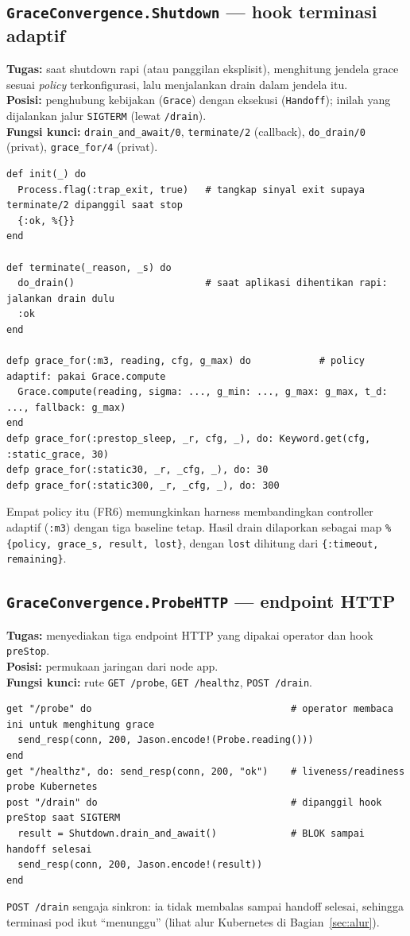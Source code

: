 \documentclass[11pt]{article}
\newcommand{\code}[1]{\texttt{\small #1}}
\begin{document}
\subsection{\texttt{GraceConvergence.Shutdown} --- hook terminasi adaptif}
\textbf{Tugas:} saat shutdown rapi (atau panggilan eksplisit), menghitung jendela grace sesuai
\emph{policy} terkonfigurasi, lalu menjalankan drain dalam jendela itu. \\
\textbf{Posisi:} penghubung kebijakan (\code{Grace}) dengan eksekusi (\code{Handoff}); inilah yang
dijalankan jalur \code{SIGTERM} (lewat \code{/drain}). \\
\textbf{Fungsi kunci:} \code{drain\_and\_await/0}, \code{terminate/2} (callback), \code{do\_drain/0}
(privat), \code{grace\_for/4} (privat).
\begin{lstlisting}[style=ex]
def init(_) do
  Process.flag(:trap_exit, true)   # tangkap sinyal exit supaya terminate/2 dipanggil saat stop
  {:ok, %{}}
end

def terminate(_reason, _s) do
  do_drain()                       # saat aplikasi dihentikan rapi: jalankan drain dulu
  :ok
end

defp grace_for(:m3, reading, cfg, g_max) do            # policy adaptif: pakai Grace.compute
  Grace.compute(reading, sigma: ..., g_min: ..., g_max: g_max, t_d: ..., fallback: g_max)
end
defp grace_for(:prestop_sleep, _r, cfg, _), do: Keyword.get(cfg, :static_grace, 30)
defp grace_for(:static30, _r, _cfg, _), do: 30
defp grace_for(:static300, _r, _cfg, _), do: 300
\end{lstlisting}
Empat policy itu (FR6) memungkinkan harness membandingkan controller adaptif (\code{:m3}) dengan tiga
baseline tetap. Hasil drain dilaporkan sebagai map \code{\%\{policy, grace\_s, result, lost\}}, dengan
\code{lost} dihitung dari \code{\{:timeout, remaining\}}.

\subsection{\texttt{GraceConvergence.ProbeHTTP} --- endpoint HTTP}
\textbf{Tugas:} menyediakan tiga endpoint HTTP yang dipakai operator dan hook \code{preStop}. \\
\textbf{Posisi:} permukaan jaringan dari node app. \\
\textbf{Fungsi kunci:} rute \code{GET /probe}, \code{GET /healthz}, \code{POST /drain}.
\begin{lstlisting}[style=ex]
get "/probe" do                                   # operator membaca ini untuk menghitung grace
  send_resp(conn, 200, Jason.encode!(Probe.reading()))
end
get "/healthz", do: send_resp(conn, 200, "ok")    # liveness/readiness probe Kubernetes
post "/drain" do                                  # dipanggil hook preStop saat SIGTERM
  result = Shutdown.drain_and_await()             # BLOK sampai handoff selesai
  send_resp(conn, 200, Jason.encode!(result))
end
\end{lstlisting}
\code{POST /drain} sengaja sinkron: ia tidak membalas sampai handoff selesai, sehingga terminasi pod
ikut ``menunggu'' (lihat alur Kubernetes di Bagian~\ref{sec:alur}).
\end{document}
